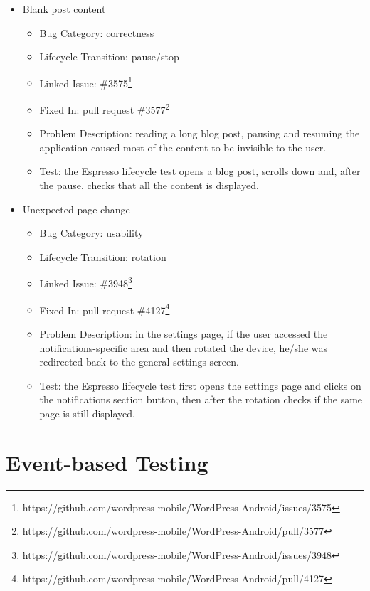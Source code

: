 \documentclass[11pt,a4paper,notitlepage]{article}
\begin{document}
{\begin{itemize}
\begin{itemize}
	\end{itemize}
	\item Blank post content
	\begin{itemize}
		\item Bug Category: correctness
		\item Lifecycle Transition: pause/stop
		\item Linked Issue: \#3575\footnote{https://github.com/wordpress-mobile/WordPress-Android/issues/3575}
		\item Fixed In: pull request \#3577\footnote{https://github.com/wordpress-mobile/WordPress-Android/pull/3577} 
		\item Problem Description: reading a long blog post, pausing and resuming the application caused most of the content to be invisible to the user.
		\item Test: the Espresso lifecycle test opens a blog post, scrolls down and, after the pause, checks that all the content is displayed.
	\end{itemize}
	\item Unexpected page change
	\begin{itemize}
		\item Bug Category: usability
		\item Lifecycle Transition: rotation
		\item Linked Issue: \#3948\footnote{https://github.com/wordpress-mobile/WordPress-Android/issues/3948}
		\item Fixed In: pull request \#4127\footnote{https://github.com/wordpress-mobile/WordPress-Android/pull/4127} 
		\item Problem Description: in the settings page, if the user accessed the notifications-specific area and then rotated the device, he/she was redirected back to the general settings screen. 
		\item Test: the Espresso lifecycle test first opens the settings page and clicks on the notifications section button, then after the rotation checks if the same page is still displayed.
	\end{itemize}
\end{itemize}
}


\newpage
\part{Event-based Testing}\label{part_events}
\end{document}
